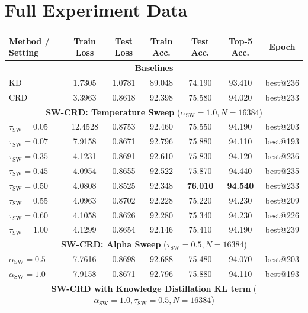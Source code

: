 \documentclass{article}
\theoremstyle{plain}
\theoremstyle{remark}
\begin{document}
\clearpage

\section{Full Experiment Data}
\label{app:data}

\begin{table}[h]
\centering
\small
\setlength{\tabcolsep}{6pt}
\begin{tabular}{lcccccc}
\toprule
\textbf{Method / Setting} & \textbf{Train Loss} & \textbf{Test Loss} &
\textbf{Train Acc.} & \textbf{Test Acc.} & \textbf{Top-5 Acc.} & \textbf{Epoch} \\
\midrule
\multicolumn{7}{c}{\textbf{Baselines}} \\
\midrule
KD & 1.7305 & 1.0781 & 89.048 & 74.190 & 93.410 & best@236 \\
CRD & 3.3963 & 0.8618 & 92.398 & 75.580 & 94.020 & best@233 \\
\midrule
\multicolumn{7}{c}{\textbf{SW-CRD: Temperature Sweep} ($\alpha_{\text{SW}}=1.0, N=16384$)} \\
\midrule
$\tau_{\text{SW}}=0.05$ & 12.4528 & 0.8753 & 92.460 & 75.550 & 94.190 & best@203 \\
$\tau_{\text{SW}}=0.07$ & 7.9158 & 0.8671 & 92.796 & 75.880 & 94.110 & best@193 \\
$\tau_{\text{SW}}=0.35$ & 4.1231 & 0.8691 & 92.610 & 75.830 & 94.120 & best@236 \\
$\tau_{\text{SW}}=0.45$ & 4.0954 & 0.8655 & 92.522 & 75.870 & 94.440 & best@235 \\
$\tau_{\text{SW}}=0.50$ & 4.0808 & 0.8525 & 92.348 & \textbf{76.010} & \textbf{94.540} & best@233 \\
$\tau_{\text{SW}}=0.55$ & 4.0963 & 0.8702 & 92.228 & 75.220 & 94.230 & best@209 \\
$\tau_{\text{SW}}=0.60$ & 4.1058 & 0.8626 & 92.280 & 75.340 & 94.230 & best@226 \\
$\tau_{\text{SW}}=1.00$ & 4.1299 & 0.8654 & 92.146 & 75.410 & 94.190 & best@239 \\
\midrule
\multicolumn{7}{c}{\textbf{SW-CRD: Alpha Sweep} ($\tau_{\text{SW}}=0.5, N=16384$)} \\
\midrule
$\alpha_{\text{SW}}=0.5$ & 7.7616 & 0.8698 & 92.688 & 75.480 & 94.070 & best@203 \\
$\alpha_{\text{SW}}=1.0$ & 7.9158 & 0.8671 & 92.796 & 75.880 & 94.110 & best@193 \\
\midrule
\multicolumn{7}{c}{\textbf{SW-CRD with Knowledge Distillation KL term} ($\alpha_{\text{SW}}=1.0, \tau_{\text{SW}}=0.5, N=16384$)} \\

\end{tabular}
\end{table}
\end{document}
